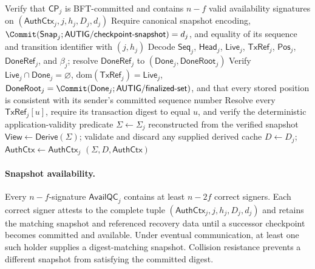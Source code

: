 \begin{algorithm}[h!]
\caption{\textsc{RecoverState}: Checkpoint Recovery and Committed Replay}
\label{alg:recover-state}
\footnotesize
{}
Verify that $\mathsf{CP}_j$ is BFT-committed and contains $n-f$ valid
availability signatures on $(\mathsf{AuthCtx}_j,j,h_j,D_j,d_j)$\;
Require canonical snapshot encoding,
$\Commit(\mathsf{Snap}_j;\mathsf{AUTIG/checkpoint\mbox{-}snapshot})=d_j$,
and equality of its sequence and transition identifier with $(j,h_j)$\;
Decode $\mathsf{Seq}_j$, $\mathsf{Head}_j$, $\mathsf{Live}_j$,
$\mathsf{TxRef}_j$, $\mathsf{Pos}_j$, $\mathsf{DoneRef}_j$, and $\beta_j$;
resolve $\mathsf{DoneRef}_j$ to
$(\mathsf{Done}_j,\mathsf{DoneRoot}_j)$\;
Verify $\mathsf{Live}_j\cap\mathsf{Done}_j=\varnothing$,
$\mathrm{dom}(\mathsf{TxRef}_j)=\mathsf{Live}_j$,
$\mathsf{DoneRoot}_j=\Commit(\mathsf{Done}_j;
\mathsf{AUTIG/finalized\mbox{-}set})$, and that every stored position is
consistent with its sender's committed sequence number\;
Resolve every $\mathsf{TxRef}_j[u]$, require its transaction digest to equal
$u$, and verify the deterministic application-validity predicate\;
$\Sigma\gets\Sigma_j$ reconstructed from the verified snapshot\;
$\mathsf{View}\gets\mathsf{Derive}(\Sigma)$; validate and discard any supplied
derived cache\;
$D\gets D_j$; $\mathsf{AuthCtx}\gets\mathsf{AuthCtx}_j$\;
\KwRet $(\Sigma,D,\mathsf{AuthCtx})$
\end{algorithm}

\paragraph{Snapshot availability.}
Every $n-f$-signature $\mathsf{AvailQC}_j$ contains at least $n-2f$ correct
signers.  Each correct signer attests to the complete tuple
$(\mathsf{AuthCtx}_j,j,h_j,D_j,d_j)$ and retains the matching snapshot and referenced
recovery data until a successor checkpoint becomes committed and available.  Under
eventual communication,
at least one such holder supplies a digest-matching snapshot.  Collision
resistance prevents a different snapshot from satisfying the committed
digest.

